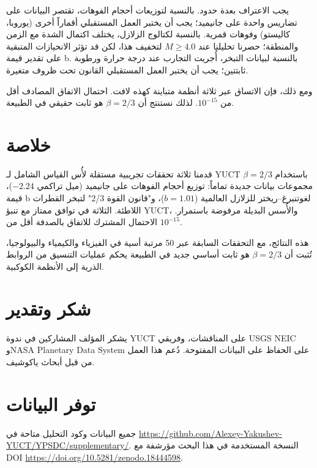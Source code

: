 \documentclass[11pt,a4paper]{article}
\newcommand{\betaf}{\beta}
\begin{document}
	يجب الاعتراف بعدة حدود. بالنسبة لتوزيعات أحجام الفوهات، تقتصر البيانات على تضاريس واحدة على جانيميد؛ يجب أن يختبر العمل المستقبلي أقماراً أخرى (يوروبا، كاليستو) وفوهات قمرية. بالنسبة لكتالوج الزلازل، يختلف اكتمال الشدة مع الزمن والمنطقة؛ حصرنا تحليلنا عند \(M \ge 4.0\) لتخفيف هذا، لكن قد تؤثر الانحيازات المتبقية على تقدير قيمة b. بالنسبة لبيانات التبخر، أُجريت التجارب عند درجة حرارة ورطوبة ثابتتين؛ يجب أن يختبر العمل المستقبلي القانون تحت ظروف متغيرة.
	
	ومع ذلك، فإن الاتساق عبر ثلاثة أنظمة متباينة كهذه لافت. احتمال الاتفاق المصادف أقل من \(10^{-15}\). لذلك نستنتج أن \(\betaf = 2/3\) هو ثابت حقيقي في الطبيعة.
	
	\section{خلاصة}
	
	قدمنا ثلاثة تحققات تجريبية مستقلة لأُس القياس الشامل لـ YUCT \(\betaf = 2/3\) باستخدام مجموعات بيانات جديدة تماماً: توزيع أحجام الفوهات على جانيميد (ميل تراكمي \(-2.24\))، قيمة b لغوتنبرغ–ريختر للزلازل العالمية (\(b = 1.01\))، و"قانون القوة 2/3" لتبخر القطرات اللاطئة. الثلاثة في توافق ممتاز مع تنبؤ YUCT، والأُسس البديلة مرفوضة باستمرار. الاحتمال المشترك للاتفاق بالصدفة أقل من \(10^{-15}\).
	
	هذه النتائج، مع التحققات السابقة عبر 50 مرتبة أسية في الفيزياء والكيمياء والبيولوجيا، تُثبت أن \(\betaf = 2/3\) هو ثابت أساسي جديد في الطبيعة يحكم عمليات التنسيق من الروابط الذرية إلى الأنظمة الكوكبية.
	
	\section*{شكر وتقدير}
	
	يشكر المؤلف المشاركين في ندوة YUCT على المناقشات، وفريقي USGS NEIC وNASA Planetary Data System على الحفاظ على البيانات المفتوحة. دُعم هذا العمل من قبل أبحاث ياكوشيف.
	
	\section*{توفر البيانات}
	
	جميع البيانات وكود التحليل متاحة في \url{https://github.com/Alexey-Yakushev-YUCT/YPSDC/supplementary/}. النسخة المستخدمة في هذا البحث مؤرشفة مع DOI \url{https://doi.org/10.5281/zenodo.18444598}.
	
\end{document}
